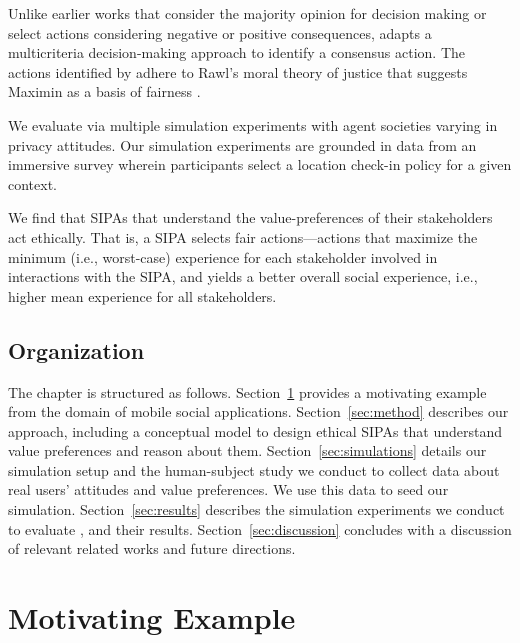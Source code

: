 Unlike earlier works \citep{TOCHI-17:Multiuser} that 
consider the majority opinion for decision making or select actions considering negative or 
positive consequences, \frameworkAinur adapts a multicriteria decision-making approach \citep{opricovic2004compromise} to identify a consensus action.  
The actions identified by \frameworkAinur adhere to Rawl's moral theory of justice 
that suggests Maximin as a basis of fairness \citep{rawls1985justice}. 

We evaluate \frameworkAinur via multiple simulation experiments with agent societies varying in privacy attitudes. 
Our simulation experiments are grounded in data from an immersive survey wherein participants select a location check-in policy for a given context.

We find that \frameworkAinur SIPAs that understand the value-preferences of their stakeholders act ethically. 
That is, a SIPA selects fair actions---actions that maximize the minimum (i.e., worst-case) experience for each stakeholder involved in interactions with the SIPA, and yields a better overall social experience, i.e., higher mean experience for all stakeholders.

\subsection{Organization}
The chapter is structured as follows. Section~\ref{sec:example} provides a
motivating example from the domain of mobile social applications.
Section~\ref{sec:method} describes our approach, including a conceptual
model to design ethical SIPAs that understand value preferences and
reason about them. Section~\ref{sec:simulations} details our simulation
setup and the human-subject study we conduct to collect data about real
users' attitudes and value preferences. We use this data to seed our
simulation. Section~\ref{sec:results} describes the simulation
experiments we conduct to evaluate \frameworkAinur, and their results.
Section~\ref{sec:discussion} concludes with a discussion of relevant
related works and future directions.

\section{Motivating Example}
\label{sec:example}

